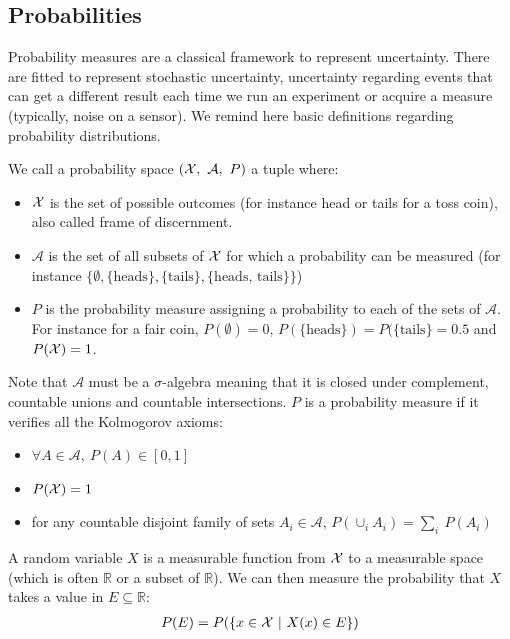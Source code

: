 \subsection{Probabilities}\label{sec:probabilities}
Probability measures are a classical framework to represent uncertainty. There are fitted to represent stochastic uncertainty, \ie uncertainty regarding events that can get a different result each time we run an experiment or acquire a measure (typically, noise on a sensor). We remind here basic definitions regarding probability distributions.

\begin{definition}\label{def:probability_space}
    We call a probability space $({\mathcal{X}},~\mathcal{A},~P)$ a tuple where:
    \begin{itemize}
        \item ${\mathcal{X}}$ is the set of possible outcomes (for instance head or tails for a toss coin), also called frame of discernment.
        \item $\mathcal{A}$ is the set of all subsets of ${\mathcal{X}}$ for which a probability can be measured (for instance $\{\emptyset, \{\text{heads}\}, \{\text{tails}\}, \{\text{heads, tails}\}\}$)
        \item $P$ is the probability measure assigning a probability to each of the sets of $\mathcal{A}$. For instance for a fair coin, $P(\emptyset)=0$, $P(\{\text{heads}\})=P(\{\text{tails}\}=0.5$ and $P({\mathcal{X}})=1$.
    \end{itemize}
    Note that $\mathcal{A}$ must be a $\sigma$-algebra meaning that it is closed under complement, countable unions and countable intersections. $P$ is a probability measure if it verifies all the Kolmogorov axioms:
    \begin{itemize}
        \item $\forall A\in\mathcal{A},~P(A)\in[0,1]$
        \item $P({\mathcal{X}}) = 1$
        \item for any countable disjoint family of sets $A_i\in\mathcal{A}$, $P(\cup_i A_i)=\sum_i~P(A_i)$
    \end{itemize}
\end{definition}

\begin{definition}
    A random variable $X$ is a measurable function from ${\mathcal{X}}$ to a measurable space (which is often $\mathbb{R}$ or a subset of $\mathbb{R}$). We can then measure the probability that $X$ takes a value in $E\subseteq\mathbb{R}$:
    \begin{align*}
        P(E) = P(\{x\in{\mathcal{X}}~|~X(x)\in E\})
    \end{align*}
\end{definition}

